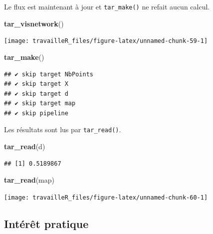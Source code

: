 \documentclass[
  12pt,
  french,
  a4paper,
  extrafontsizes,onecolumn,openright
  ]{memoir}
\newenvironment{Shaded}{\begin{snugshade}}{\end{snugshade}}
\newcommand{\KeywordTok}[1]{\textcolor[rgb]{0.13,0.29,0.53}{\textbf{#1}}}
\newcommand{\NormalTok}[1]{#1}
\begin{document}
\normalsize

Le flux est maintenant à jour et \texttt{tar\_make()} ne refait aucun calcul.

\scriptsize

\begin{Shaded}
\begin{Highlighting}[]
\KeywordTok{tar_visnetwork}\NormalTok{()}
\end{Highlighting}
\end{Shaded}

\begin{center}\texttt{[image: travailleR\_files/figure-latex/unnamed-chunk-59-1]} \end{center}

\begin{Shaded}
\begin{Highlighting}[]
\KeywordTok{tar_make}\NormalTok{()}
\end{Highlighting}
\end{Shaded}

\begin{verbatim}
## ✔ skip target NbPoints
## ✔ skip target X
## ✔ skip target d
## ✔ skip target map
## ✔ skip pipeline
\end{verbatim}

\normalsize

Les résultats sont lus par \texttt{tar\_read()}.

\scriptsize

\begin{Shaded}
\begin{Highlighting}[]
\KeywordTok{tar_read}\NormalTok{(d)}
\end{Highlighting}
\end{Shaded}

\begin{verbatim}
## [1] 0.5189867
\end{verbatim}

\begin{Shaded}
\begin{Highlighting}[]
\KeywordTok{tar_read}\NormalTok{(map)}
\end{Highlighting}
\end{Shaded}

\begin{center}\texttt{[image: travailleR\_files/figure-latex/unnamed-chunk-60-1]} \end{center}

\normalsize

\hypertarget{intuxe9ruxeat-pratique}{%
\subsection{Intérêt pratique}\label{intuxe9ruxeat-pratique}}
\end{document}
